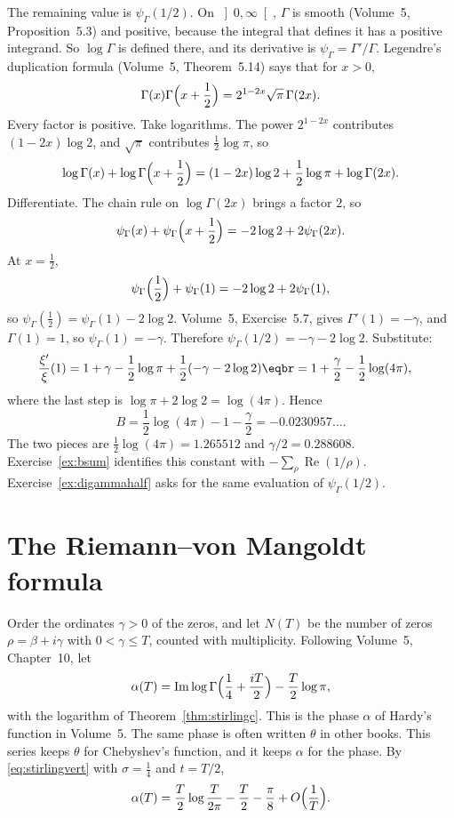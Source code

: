 The remaining value is $\psi_\Gamma(1/2)$. On $\left]0,\infty\right[$, $\Gamma$ is smooth (Volume~5, Proposition~5.3) and positive, because the integral that defines it has a positive integrand. So $\log\Gamma$ is defined there, and its derivative is $\psi_\Gamma=\Gamma'/\Gamma$. Legendre's duplication formula (Volume~5, Theorem~5.14) says that for $x>0$,
\[
\Gamma(x)\Gamma\Bigl(x+\frac12\Bigr)=2^{1-2x}\sqrt\pi\,\Gamma(2x).
\]
Every factor is positive. Take logarithms. The power $2^{1-2x}$ contributes $(1-2x)\log2$, and $\sqrt\pi$ contributes $\frac12\log\pi$, so
\[
\log\Gamma(x)+\log\Gamma\Bigl(x+\frac12\Bigr)=(1-2x)\log2+\frac12\log\pi+\log\Gamma(2x).
\]
Differentiate. The chain rule on $\log\Gamma(2x)$ brings a factor $2$, so
\[
\psi_\Gamma(x)+\psi_\Gamma\Bigl(x+\frac12\Bigr)=-2\log2+2\psi_\Gamma(2x).
\]
At $x=\frac12$,
\[
\psi_\Gamma\Bigl(\frac12\Bigr)+\psi_\Gamma(1)=-2\log2+2\psi_\Gamma(1),
\]
so $\psi_\Gamma(\frac12)=\psi_\Gamma(1)-2\log2$.
Volume~5, Exercise~5.7, gives $\Gamma'(1)=-\gamma$, and $\Gamma(1)=1$, so $\psi_\Gamma(1)=-\gamma$. Therefore $\psi_\Gamma(1/2)=-\gamma-2\log2$. Substitute:
\[
\begin{aligned}\frac{\xi'}{\xi}(1)
&=1+\gamma-\frac12\log\pi+\frac12(-\gamma-2\log2)\eqbr=1+\frac\gamma2-\frac12\log(4\pi),\end{aligned}
\]
where the last step is $\log\pi+2\log2=\log(4\pi)$. Hence
\[
B=\frac12\log(4\pi)-1-\frac\gamma2=-0.0230957\ldots.
\]
The two pieces are $\frac12\log(4\pi)=1.265512$ and $\gamma/2=0.288608$. Exercise~\ref{ex:bsum} identifies this constant with $-\sum_\rho\operatorname{Re}(1/\rho)$. Exercise~\ref{ex:digammahalf} asks for the same evaluation of $\psi_\Gamma(1/2)$.

\section{The Riemann--von Mangoldt formula}

Order the ordinates $\gamma>0$ of the zeros, and let $N(T)$ be the number of zeros $\rho=\beta+i\gamma$ with $0<\gamma\le T$, counted with multiplicity. Following Volume~5, Chapter~10, let
\[
\alpha(T)=\operatorname{Im}\log\Gamma\Bigl(\frac14+\frac{iT}2\Bigr)-\frac T2\log\pi,
\]
with the logarithm of Theorem~\ref{thm:stirlingc}. This is the phase $\alpha$ of Hardy's function in Volume~5. The same phase is often written $\theta$ in other books. This series keeps $\theta$ for Chebyshev's function, and it keeps $\alpha$ for the phase. By \eqref{eq:stirlingvert} with $\sigma=\frac14$ and $t=T/2$,
\begin{equation}\label{eq:theta}
\alpha(T)=\frac T2\log\frac T{2\pi}-\frac T2-\frac\pi8+O\Bigl(\frac1T\Bigr).
\end{equation}

